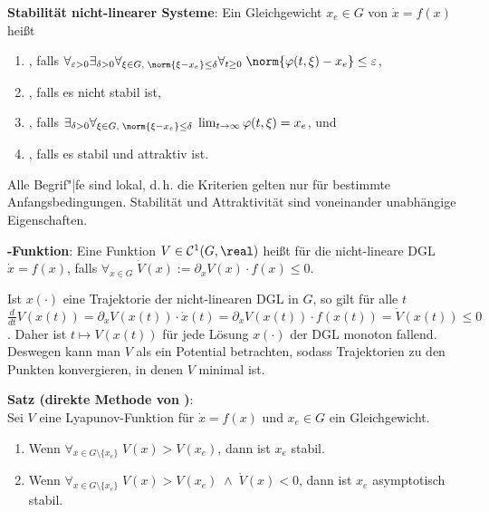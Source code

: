 \textbf{Stabilität nicht-linearer Systeme}:
Ein Gleichgewicht $x_e \in G$ von $\dot{x} = f(x)$ heißt
\begin{enumerate}
    \item
    , falls
    $\forall_{\varepsilon > 0} \exists_{\delta > 0}
    \forall_{\xi \in G,\; \norm{\xi - x_e} \le \delta} \forall_ {t \ge 0}\;
    \norm{\varphi(t, \xi) - x_e} \le \varepsilon$,

    \item
    , falls es nicht stabil ist,

    \item
    , falls
    $\exists_{\delta > 0} \forall_{\xi \in G,\; \norm{\xi - x_e} \le \delta}\;
    \lim_{t \to \infty} \varphi(t, \xi) = x_e$, und

    \item
    , falls es stabil und attraktiv ist.
\end{enumerate}

Alle Begrif"|fe sind lokal, d.\,h. die Kriterien gelten nur für bestimmte Anfangsbedingungen.
Stabilität und Attraktivität sind voneinander unabhängige Eigenschaften.

\linie

\textbf{-Funktion}:
Eine Funktion $V \in \C^1(G, \real)$ heißt
 für die nicht-lineare DGL $\dot{x} = f(x)$, falls
$\forall_{x \in G}\; \dot{V}(x) := \partial_x V(x) \cdot f(x) \le 0$.

Ist $x(\cdot)$ eine Trajektorie der nicht-linearen DGL in $G$, so gilt für alle $t$\\
$\frac{d}{dt} V(x(t)) = \partial_x V(x(t)) \cdot \dot{x}(t)
= \partial_x V(x(t)) \cdot f(x(t)) = \dot{V}(x(t)) \le 0$.
Daher ist $t \mapsto V(x(t))$ für jede Lösung $x(\cdot)$ der DGL monoton fallend.
Deswegen kann man $V$ als ein Potential betrachten,
sodass Trajektorien zu den Punkten konvergieren, in denen $V$ minimal ist.

\linie

\textbf{Satz (direkte Methode von )}:\\
Sei $V$ eine Lyapunov-Funktion für $\dot{x} = f(x)$ und $x_e \in G$ ein Gleichgewicht.
\begin{enumerate}
    \item
    Wenn $\forall_{x \in G \setminus \{x_e\}}\; V(x) > V(x_e)$,
    dann ist $x_e$ stabil.

    \item
    Wenn $\forall_{x \in G \setminus \{x_e\}}\; V(x) > V(x_e) \;\land\; \dot{V}(x) < 0$,
    dann ist $x_e$ asymptotisch stabil.
\end{enumerate}

